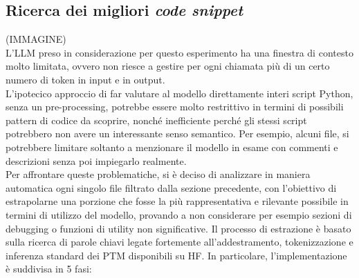 \documentclass{article}
\begin{document}
\subsection{Ricerca dei migliori \textit{code snippet}}
(IMMAGINE)\\
L'LLM preso in considerazione per questo esperimento ha una finestra di contesto molto limitata, ovvero non riesce a gestire per ogni chiamata più di un certo numero di token in input e in output.\\
L'ipotecico approccio di far valutare al modello direttamente interi script Python, senza un pre-processing, potrebbe essere molto restrittivo in termini di possibili pattern di codice da scoprire, nonché inefficiente perché gli stessi script potrebbero non avere un interessante senso semantico. Per esempio, alcuni file, si potrebbere limitare soltanto a menzionare il modello in esame con commenti e descrizioni senza poi impiegarlo realmente.\\
Per affrontare queste problematiche, si è deciso di analizzare in maniera automatica ogni singolo file filtrato dalla sezione precedente, con l'obiettivo di estrapolarne una porzione che fosse la più rappresentativa e rilevante possibile in termini di utilizzo del modello, provando a non considerare per esempio sezioni di debugging o funzioni di utility non significative. Il processo di estrazione è basato sulla ricerca di parole chiavi legate fortemente all'addestramento, tokenizzazione e inferenza standard dei PTM disponibili su HF. In particolare, l'implementazione è suddivisa in 5 fasi:\\
\end{document}
